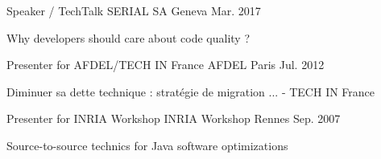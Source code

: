 

\begin{cventries}

\cventry
{Speaker / TechTalk } %
{SERIAL SA} %
{Geneva} %
{Mar. 2017} %
{
	\begin{cvitems} %
		\item {Why developers should care about code quality ?}
	\end{cvitems}
}


  \cventry
    {Presenter for AFDEL/TECH IN France} %
    {AFDEL} %
    {Paris} %
    {Jul. 2012} %
    {
      \begin{cvitems} %
        \item {Diminuer sa dette technique : stratégie de migration ... - TECH IN France}
      \end{cvitems}
    }

  \cventry
    {Presenter for INRIA Workshop} %
    {INRIA Workshop} %
    {Rennes} %
    {Sep. 2007} %
    {
      \begin{cvitems} %
        \item {Source-to-source technics for Java software optimizations}
      \end{cvitems}
    }

\end{cventries}
